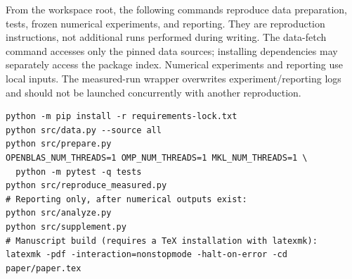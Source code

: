 \documentclass{article}
\begin{document}
From the workspace root, the following commands reproduce data preparation, tests, frozen numerical experiments, and reporting. They are reproduction instructions, not additional runs performed during writing. The data-fetch command accesses only the pinned data sources; installing dependencies may separately access the package index. Numerical experiments and reporting use local inputs. The measured-run wrapper overwrites experiment/reporting logs and should not be launched concurrently with another reproduction.
\begin{verbatim}
python -m pip install -r requirements-lock.txt
python src/data.py --source all
python src/prepare.py
OPENBLAS_NUM_THREADS=1 OMP_NUM_THREADS=1 MKL_NUM_THREADS=1 \
  python -m pytest -q tests
python src/reproduce_measured.py
# Reporting only, after numerical outputs exist:
python src/analyze.py
python src/supplement.py
# Manuscript build (requires a TeX installation with latexmk):
latexmk -pdf -interaction=nonstopmode -halt-on-error -cd paper/paper.tex
\end{verbatim}
\end{document}
